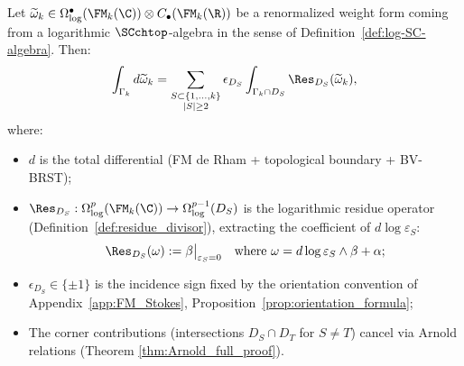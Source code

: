 \begin{theorem}
\label{thm:stokes_cluster}
Let $\widetilde{\omega}_k \in \Omega^{\bullet}_{\log}(\FM_k(\C)) \otimes C_\bullet(\FM_k(\R))$ be a renormalized weight form coming from a logarithmic $\SCchtop$-algebra in the sense of Definition~\ref{def:log-SC-algebra}. Then:
\[
\int_{\Gamma_k} d\widetilde{\omega}_k =
\sum_{\substack{S \subset \{1, \ldots, k\} \\ |S| \geq 2}}
\epsilon_{D_S}
\int_{\Gamma_k \cap D_S} \Res_{D_S}(\widetilde{\omega}_k),
\]
where:
\begin{itemize}
\item $d$ is the total differential (FM de Rham + topological boundary + BV-BRST);

\item $\Res_{D_S} : \Omega^{p}_{\log}(\FM_k(\C)) \to \Omega^{p-1}_{\log}(D_S)$ is the logarithmic residue operator (Definition~\ref{def:residue_divisor}), extracting the coefficient of $d\log\varepsilon_S$:
\[
\Res_{D_S}(\omega) := \beta\big|_{\varepsilon_S = 0} \quad \text{where } \omega = d\log\varepsilon_S \wedge \beta + \alpha;
\]

\item \(\epsilon_{D_S}\in\{\pm1\}\) is the incidence sign fixed by
the orientation convention of
Appendix~\ref{app:FM_Stokes}, Proposition~\ref{prop:orientation_formula};

\item The corner contributions (intersections $D_S \cap D_T$ for $S \neq T$) cancel via Arnold relations (Theorem \ref{thm:Arnold_full_proof}).
\end{itemize}
\end{theorem}


